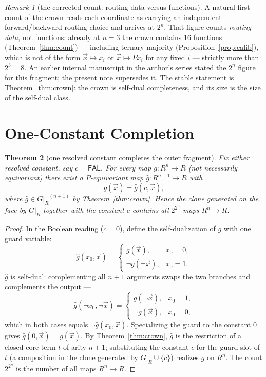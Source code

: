 \documentclass[11pt]{article}
\newtheorem{theorem}{Theorem}[section]
\theoremstyle{remark}
\newtheorem{remarkc}[theorem]{Remark}
\newcommand{\FAL}{\ensuremath{\mathsf{FAL}}}
\newcommand{\GR}{\ensuremath{G|_R}}
\begin{document}
\begin{remarkc}[the corrected count: routing data versus functions]
\label{rem:miscount}
A natural first count of the crown reads each coordinate as carrying an
independent forward/backward routing choice and arrives at $2^n$. That
figure counts \emph{routing data}, not functions: already at $n=3$ the
crown contains 16 functions (Theorem~\ref{thm:count}) --- including
ternary majority (Proposition~\ref{prop:calib}), which is not of the form
$\vec x\mapsto x_i$ or $\vec x\mapsto Px_i$ for any fixed $i$ ---
strictly more than $2^3=8$. An earlier internal manuscript in the
author's series stated the $2^n$ figure for this fragment; the present
note supersedes it. The stable statement is Theorem~\ref{thm:crown}: the
crown is self-dual completeness, and its size is the size of the
self-dual class.
\end{remarkc}

\section{One-Constant Completion}

\begin{theorem}[one resolved constant completes the outer fragment]
\label{thm:completion}
Fix either resolved constant, say $c=\FAL$. For every map $g:R^n\to R$
(not necessarily equivariant) there exist a $P$-equivariant map
$\hat g:R^{n+1}\to R$ with
\[
g(\vec x) = \hat g(c,\vec x),
\]
where $\hat g\in\GR^{(n+1)}$ by Theorem~\ref{thm:crown}. Hence the clone
generated on the face by \GR{} together with the constant $c$ contains
all $2^{2^n}$ maps $R^n\to R$.
\end{theorem}

\begin{proof}
In the Boolean reading ($c=0$), define the self-dualization of $g$ with
one guard variable:
\[
\hat g(x_0,\vec x)=
\begin{cases}
g(\vec x), & x_0=0,\\
\neg g(\neg\vec x), & x_0=1.
\end{cases}
\]
$\hat g$ is self-dual: complementing all $n+1$ arguments swaps the two
branches and complements the output ---
\[
\hat g(\neg x_0,\neg\vec x)=
\begin{cases}
g(\neg\vec x), & x_0=1,\\
\neg g(\vec x), & x_0=0,
\end{cases}
\]
which in both cases equals $\neg\hat g(x_0,\vec x)$. Specializing the
guard to the constant $0$ gives $\hat g(0,\vec x)=g(\vec x)$. By
Theorem~\ref{thm:crown}, $\hat g$ is the restriction of a closed-core
term $t$ of arity $n+1$; substituting the constant $c$ for the guard slot
of $t$ (a composition in the clone generated by $\GR\cup\{c\}$) realizes
$g$ on $R^n$. The count $2^{2^n}$ is the number of all maps $R^n\to R$.
\end{proof}
\end{document}
